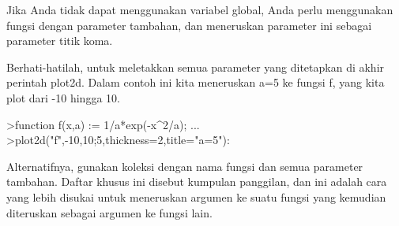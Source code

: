\documentclass[a4paper,10pt]{article}
\begin{document}
\begin{eulernotebook}
\begin{eulercomment}
\begin{eulercomment}
\begin{eulercomment}
\begin{eulercomment}
\begin{eulercomment}
\begin{eulercomment}
\begin{eulercomment}
\begin{eulercomment}
\begin{eulercomment}
\begin{eulercomment}
\begin{eulercomment}
\begin{eulercomment}
\begin{eulercomment}
\begin{eulercomment}
\begin{eulercomment}
\begin{eulercomment}
\begin{eulercomment}
\begin{eulercomment}
\begin{eulercomment}
\begin{eulercomment}
\begin{eulercomment}
\begin{eulercomment}
\begin{eulercomment}
\begin{eulercomment}
\begin{eulercomment}
\begin{eulercomment}
\begin{eulercomment}
\begin{eulercomment}
\begin{eulercomment}
\begin{eulercomment}
\begin{eulercomment}
\begin{eulercomment}
\begin{eulercomment}
\begin{eulercomment}
\begin{eulercomment}
\begin{eulercomment}
\begin{eulercomment}
Jika Anda tidak dapat menggunakan variabel global, Anda perlu
menggunakan fungsi dengan parameter tambahan, dan meneruskan parameter
ini sebagai parameter titik koma.

Berhati-hatilah, untuk meletakkan semua parameter yang ditetapkan di
akhir perintah plot2d. Dalam contoh ini kita meneruskan a=5 ke fungsi
f, yang kita plot dari -10 hingga 10.
\end{eulercomment}
\begin{eulerprompt}
>function f(x,a) := 1/a*exp(-x^2/a); ...
>plot2d("f",-10,10;5,thickness=2,title="a=5"):
\end{eulerprompt}
\begin{eulercomment}
Alternatifnya, gunakan koleksi dengan nama fungsi dan semua parameter
tambahan. Daftar khusus ini disebut kumpulan panggilan, dan ini adalah
cara yang lebih disukai untuk meneruskan argumen ke suatu fungsi yang
kemudian diteruskan sebagai argumen ke fungsi lain.


\end{eulercomment}
\end{eulercomment}
\end{eulercomment}
\end{eulercomment}
\end{eulercomment}
\end{eulercomment}
\end{eulercomment}
\end{eulercomment}
\end{eulercomment}
\end{eulercomment}
\end{eulercomment}
\end{eulercomment}
\end{eulercomment}
\end{eulercomment}
\end{eulercomment}
\end{eulercomment}
\end{eulercomment}
\end{eulercomment}
\end{eulercomment}
\end{eulercomment}
\end{eulercomment}
\end{eulercomment}
\end{eulercomment}
\end{eulercomment}
\end{eulercomment}
\end{eulercomment}
\end{eulercomment}
\end{eulercomment}
\end{eulercomment}
\end{eulercomment}
\end{eulercomment}
\end{eulercomment}
\end{eulercomment}
\end{eulercomment}
\end{eulercomment}
\end{eulercomment}
\end{eulercomment}
\end{eulernotebook}
\end{document}
